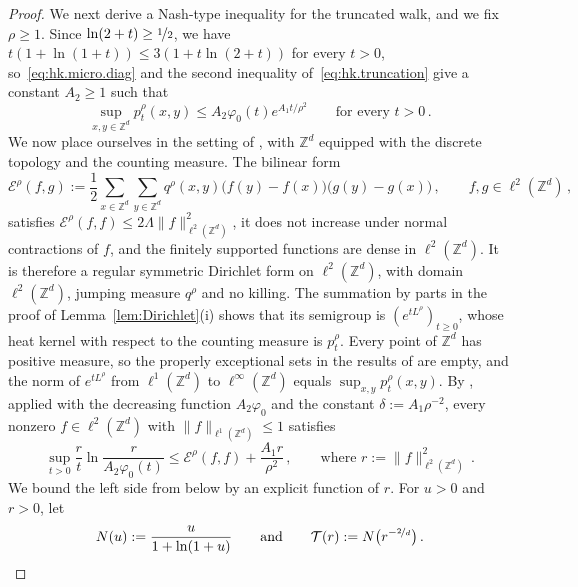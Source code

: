 \documentclass[11pt]{amsart}
\numberwithin{equation}{section}
\newcommand{\Z}{\mathbb{Z}}
\newcommand{\nf}{\nicefrac}
\begin{document}
\begin{proof}
We next derive a Nash-type inequality for the truncated walk, and we fix $\rho \geq 1$.
Since $\ln(2 + t) \geq \nf12$, we have $t (1 + \ln(1 + t)) \leq 3 (1 + t \ln(2 + t))$ for every $t > 0$, so~\eqref{eq:hk.micro.diag} and the second inequality of~\eqref{eq:hk.truncation} give a constant $A_2 \geq 1$ such that
\begin{equation*}
    \sup_{x, y \in \Z^d} p^\rho_t(x,y) \leq A_2 \varphi_0(t) e^{A_1 t / \rho^2} \qquad \text{for every } t > 0\,.
\end{equation*}
We now place ourselves in the setting of \citet{ChenKimKumagaiWang2021}, with $\Z^d$ equipped with the discrete topology and the counting measure.
The bilinear form
\begin{equation*}
    \mathcal{E}^\rho(f, g) := \frac12 \sum_{x \in \Z^d} \sum_{y \in \Z^d} q^\rho(x, y) \bigl( f(y) - f(x) \bigr) \bigl( g(y) - g(x) \bigr)\,, \qquad f, g \in \ell^2(\Z^d)\,,
\end{equation*}
satisfies $\mathcal{E}^\rho(f, f) \leq 2 \Lambda \|f\|_{\ell^2(\Z^d)}^2$, it does not increase under normal contractions of $f$, and the finitely supported functions are dense in $\ell^2(\Z^d)$.
It is therefore a regular symmetric Dirichlet form on $\ell^2(\Z^d)$, with domain $\ell^2(\Z^d)$, jumping measure $q^\rho$ and no killing.
The summation by parts in the proof of Lemma~\ref{lem:Dirichlet}(i) shows that its semigroup is $(e^{t L^\rho})_{t \geq 0}$, whose heat kernel with respect to the counting measure is $p^\rho_t$.
Every point of $\Z^d$ has positive measure, so the properly exceptional sets in the results of \citet{ChenKimKumagaiWang2021} are empty, and the norm of $e^{t L^\rho}$ from $\ell^1(\Z^d)$ to $\ell^\infty(\Z^d)$ equals $\sup_{x, y} p^\rho_t(x,y)$.
By \citet[Proposition~3.1(ii)]{ChenKimKumagaiWang2021}, applied with the decreasing function $A_2 \varphi_0$ and the constant $\delta := A_1 \rho^{-2}$, every nonzero $f \in \ell^2(\Z^d)$ with $\|f\|_{\ell^1(\Z^d)} \leq 1$ satisfies
\begin{equation*}
    \sup_{t > 0} \frac{r}{t} \ln \frac{r}{A_2 \varphi_0(t)} \leq \mathcal{E}^\rho(f, f) + \frac{A_1 r}{\rho^2}\,, \qquad \text{where } r := \|f\|_{\ell^2(\Z^d)}^2\,.
\end{equation*}
We bound the left side from below by an explicit function of $r$.
For $u > 0$ and $r > 0$, let
\begin{equation*}
    N(u) := \frac{u}{1 + \ln(1 + u)}
    \qquad \text{and} \qquad
    \mathcal{T}(r) := N \bigl( r^{-\nf{2}{d}} \bigr)\,.
\end{equation*}

\end{proof}
\end{document}
